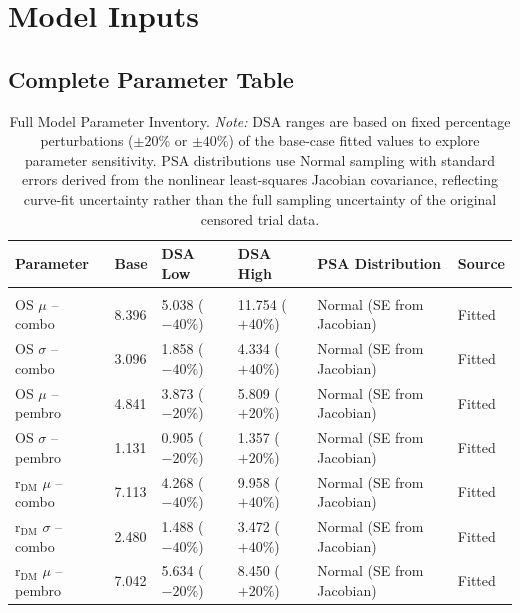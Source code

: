 \documentclass[11pt,a4paper]{article}
\begin{document}
\section{Model Inputs}
\label{sec:inputs}

\subsection{Complete Parameter Table}
\begin{landscape}
\begin{table}[p]
\centering
\caption{Full Model Parameter Inventory. \textit{Note:} DSA ranges are based on fixed percentage perturbations ($\pm20\%$ or $\pm40\%$) of the base-case fitted values to explore parameter sensitivity. PSA distributions use Normal sampling with standard errors derived from the nonlinear least-squares Jacobian covariance, reflecting curve-fit uncertainty rather than the full sampling uncertainty of the original censored trial data.}
\label{tab:s8}
\footnotesize
\setlength{\tabcolsep}{4pt}
\renewcommand{\arraystretch}{0.95}
\begin{tabularx}{\linewidth}{@{}>{\raggedright\arraybackslash}Xlll>{\raggedright\arraybackslash}Xl@{}}
\toprule
\textbf{Parameter} & \textbf{Base} & \textbf{DSA Low} & \textbf{DSA High} & \textbf{PSA Distribution} & \textbf{Source} \\
\midrule
\multicolumn{6}{c}{\textit{Clinical Parameters}} \\
OS $\mu$ -- combo & 8.396 & 5.038 ($-40\%$) & 11.754 ($+40\%$) & Normal (SE from Jacobian) & Fitted \\
OS $\sigma$ -- combo & 3.096 & 1.858 ($-40\%$) & 4.334 ($+40\%$) & Normal (SE from Jacobian) & Fitted \\
OS $\mu$ -- pembro & 4.841 & 3.873 ($-20\%$) & 5.809 ($+20\%$) & Normal (SE from Jacobian) & Fitted \\
OS $\sigma$ -- pembro & 1.131 & 0.905 ($-20\%$) & 1.357 ($+20\%$) & Normal (SE from Jacobian) & Fitted \\
r$_{\text{DM}}$ $\mu$ -- combo & 7.113 & 4.268 ($-40\%$) & 9.958 ($+40\%$) & Normal (SE from Jacobian) & Fitted \\
r$_{\text{DM}}$ $\sigma$ -- combo & 2.480 & 1.488 ($-40\%$) & 3.472 ($+40\%$) & Normal (SE from Jacobian) & Fitted \\
r$_{\text{DM}}$ $\mu$ -- pembro & 7.042 & 5.634 ($-20\%$) & 8.450 ($+20\%$) & Normal (SE from Jacobian) & Fitted \\

\end{tabularx}
\end{table}
\end{landscape}
\end{document}
